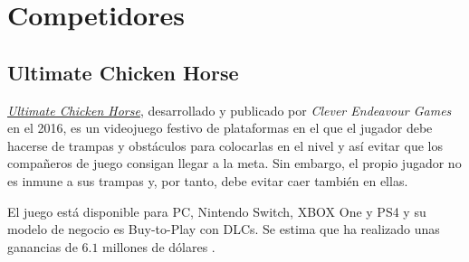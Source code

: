 \section{Competidores} %

\subsection{Ultimate Chicken Horse}

\href{https://www.cleverendeavourgames.com/ultimate-chicken-horse/}{\emph{Ultimate
Chicken Horse}}, desarrollado y publicado por \emph{Clever Endeavour Games} en
el 2016, es un videojuego festivo de plataformas en el que el jugador debe
hacerse de trampas y obstáculos para colocarlas en el nivel y así evitar que los
compañeros de juego consigan llegar a la meta. Sin embargo, el propio jugador no
es inmune a sus trampas y, por tanto, debe evitar caer también en ellas.

El juego está disponible para PC, Nintendo Switch, XBOX One y PS4 y su modelo de
negocio es Buy-to-Play con DLCs. Se estima que ha realizado unas ganancias de
$6.1$ millones de dólares \cite{noauthor_ultimate_nodate}.

